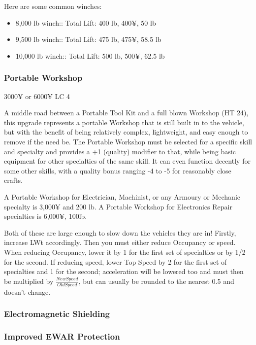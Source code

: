 \begin{multicols*}{2}
	Here are some common winches:
	\begin{itemize}
		\itemsep 0pt
		\item 8,000 lb winch:: Total Lift: 400 lb, 400¥, 50 lb
		\item 9,500 lb winch:: Total Lift: 475 lb, 475¥, 58.5 lb
		\item 10,000 lb winch:: Total Lift: 500 lb, 500¥, 62.5 lb
	\end{itemize}
	
	\subsubsection{Portable Workshop}
	3000¥ or 6000¥ LC 4
	
	A middle road between a Portable Tool Kit and a full blown Workshop (HT 24), this upgrade represents a portable Workshop that is still built in to the vehicle, but with the benefit of being relatively complex, lightweight, and easy enough to remove if the need be. The Portable Workshop must be selected for a specific skill and specialty and provides a +1 (quality) modifier to that, while being basic equipment for other specialties of the same skill. It can even function decently for some other skills, with a quality bonus ranging -4 to -5 for reasonably close crafts.
	
	A Portable Workshop for Electrician, Machinist, or any Armoury or Mechanic specialty is 3,000¥ and 200 lb. A Portable Workshop for Electronics Repair specialties is 6,000¥, 100lb.
	
	Both of these are large enough to slow down the vehicles they are in! Firstly, increase LWt accordingly. Then you must either reduce Occupancy or speed. When reducing Occupancy, lower it by 1 for the first set of specialties or by 1/2 for the second. If reducing speed, lower Top Speed by 2 for the first set of specialties and 1 for the second; acceleration will be lowered too and must then be multiplied by $\frac{New Speed}{Old Speed}$, but can usually be rounded to the nearest 0.5 and doesn't change.
	
	\subsubsection{Electromagnetic Shielding}
	
	\subsubsection{Improved EWAR Protection}
	

\end{multicols*}

